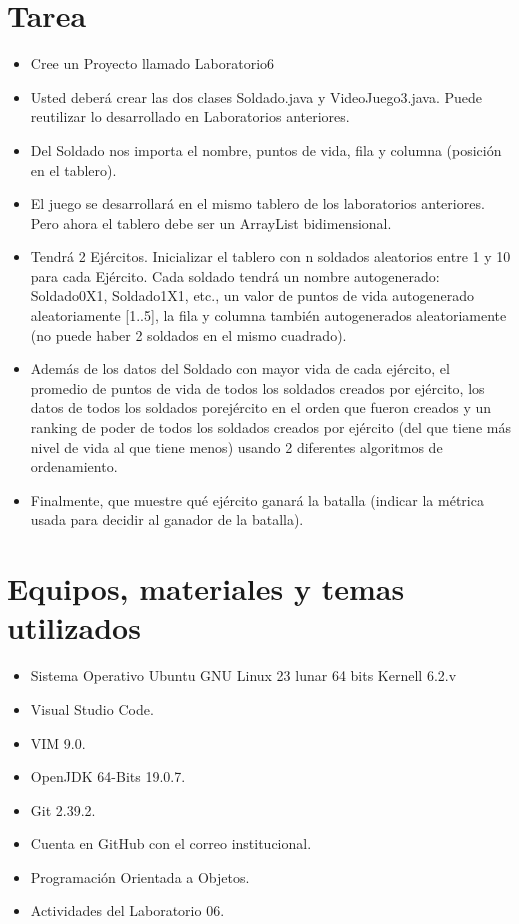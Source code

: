 \documentclass{article}
\begin{document}
	\section{Tarea}
	\begin{itemize}		
        \item Cree un Proyecto llamado Laboratorio6
		\item Usted deberá crear las dos clases Soldado.java y VideoJuego3.java. Puede reutilizar lo desarrollado en Laboratorios anteriores.
		\item Del Soldado nos importa el nombre, puntos de vida, fila y columna (posición en el tablero).
		\item El juego se desarrollará en el mismo tablero de los laboratorios anteriores. Pero ahora el tablero debe ser un ArrayList bidimensional.
		\item Tendrá 2 Ejércitos. Inicializar el tablero con n soldados aleatorios entre 1 y 10 para cada Ejército. Cada soldado tendrá un nombre autogenerado: Soldado0X1, Soldado1X1, etc., un valor de puntos de vida autogenerado aleatoriamente [1..5], la fila y columna también autogenerados aleatoriamente (no puede haber 2 soldados en el mismo cuadrado). 
		\item Además de los datos del Soldado con mayor vida de cada ejército, el promedio de puntos de vida de todos los soldados creados por ejército, los datos de todos los soldados porejército en el orden que fueron creados y un ranking de poder de todos los soldados creados por ejército (del que tiene más nivel de vida al que tiene menos) usando 2 diferentes algoritmos de ordenamiento.
		\item Finalmente, que muestre qué ejército ganará la batalla (indicar la métrica usada para decidir al ganador de la batalla).
	\end{itemize}

	\section{Equipos, materiales y temas utilizados}
	\begin{itemize}
		\item Sistema Operativo Ubuntu GNU Linux 23 lunar 64 bits Kernell 6.2.v
		\item Visual Studio Code.
		\item VIM 9.0.
		\item OpenJDK 64-Bits 19.0.7.
		\item Git 2.39.2.
		\item Cuenta en GitHub con el correo institucional.
		\item Programación Orientada a Objetos.
		\item Actividades del Laboratorio 06.	
	\end{itemize}
	
\end{document}
